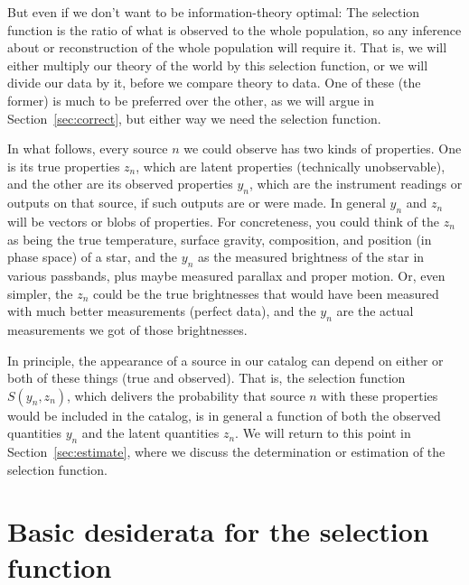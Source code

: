 \documentclass[modern]{aastex62}
\newcommand{\sectionname}{Section}
\begin{document}
But even if we don't want to be information-theory optimal: The
selection function is the ratio of what is observed to the whole
population, so any inference about or reconstruction of the whole
population will require it.
That is, we will either multiply our theory of the world by this
selection function, or we will divide our data by it, before we
compare theory to data.
One of these (the former) is much to be preferred over the other, as
we will argue in \sectionname~\ref{sec:correct}, but either way we
need the selection function.

In what follows, every source $n$ we could observe has two kinds of
properties.
One is its true properties $z_n$, which are latent
properties (technically unobservable), and the other are its observed
properties $y_n$, which are the instrument readings or outputs on that
source, if such outputs are or were made.
In general $y_n$ and $z_n$ will be vectors or blobs of properties.
For concreteness, you could think of the $z_n$ as being the true
temperature, surface gravity, composition, and position (in phase
space) of a star, and the $y_n$ as the measured brightness of the star
in various passbands, plus maybe measured parallax and proper motion.
Or, even simpler, the $z_n$ could be the true brightnesses that would
have been measured with much better measurements (perfect data), and
the $y_n$ are the actual measurements we got of those brightnesses.

In principle, the appearance of a source in our catalog can depend
on either or both of these things (true and observed).
That is, the selection function $S(y_n, z_n)$, which delivers the
probability that source $n$ with these properties would be included in
the catalog, is in general a function of both the observed quantities
$y_n$ and the latent quantities $z_n$.
We will return to this point in \sectionname~\ref{sec:estimate},
where we discuss the determination or estimation of the selection
function.

\section{Basic desiderata for the selection function}\label{sec:desiderata}
\end{document}
